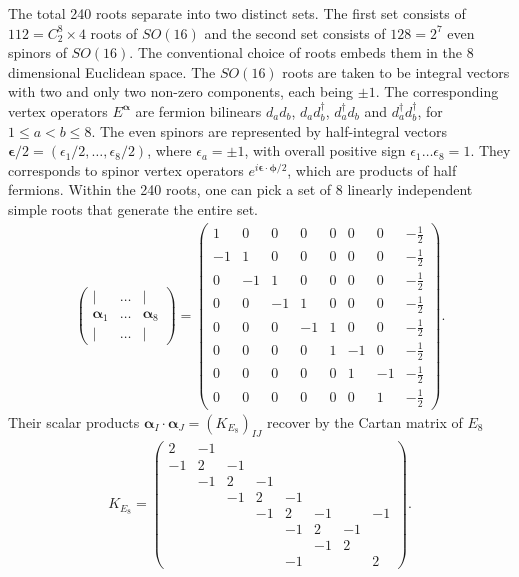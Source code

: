The total 240 roots separate into two distinct sets. The first set consists of $112=C^8_2\times4$ roots of $SO(16)$ and the second set consists of $128=2^7$ even spinors of $SO(16)$. The conventional choice of roots embeds them in the 8 dimensional Euclidean space. The $SO(16)$ roots are taken to be integral vectors with two and only two non-zero components, each being $\pm1$. The corresponding vertex operators $E^{\boldsymbol\alpha}$ are fermion bilinears $d_ad_b$, $d_ad_b^\dagger$, $d_a^\dagger d_b$ and $d_a^\dagger d_b^\dagger$, for $1\leq a<b\leq8$. The even spinors are represented by half-integral vectors $\boldsymbol\epsilon/2=(\epsilon_1/2,\ldots,\epsilon_8/2)$, where $\epsilon_a=\pm1$, with overall positive sign $\epsilon_1\ldots\epsilon_8=1$. They corresponds to spinor vertex operators $e^{i\boldsymbol\epsilon\cdot\boldsymbol\phi/2}$, which are products of half fermions. Within the 240 roots, one can pick a set of 8 linearly independent simple roots that generate the entire set. \begin{gather}\begin{pmatrix}|&\ldots&|\\\boldsymbol\alpha_1&\ldots&\boldsymbol\alpha_8\\|&\ldots&|\end{pmatrix}=\left(\begin{smallmatrix}
1 & 0 & 0 & 0 & 0 & 0 & 0 & -\frac{1}{2} \\
-1 & 1 & 0 & 0 & 0 & 0 & 0 & -\frac{1}{2} \\
0 & -1 & 1 & 0 & 0 & 0 & 0 & -\frac{1}{2} \\
0 & 0 & -1 & 1 & 0 & 0 & 0 & -\frac{1}{2} \\
0 & 0 & 0 & -1 & 1 & 0 & 0 & -\frac{1}{2} \\
0 & 0 & 0 & 0 & 1 & -1 & 0 & -\frac{1}{2} \\
0 & 0 & 0 & 0 & 0 & 1 & -1 & -\frac{1}{2} \\
0 & 0 & 0 & 0 & 0 & 0 & 1 & -\frac{1}{2} \end{smallmatrix}\right).\label{E8simpleroots0}\end{gather} Their scalar products $\boldsymbol\alpha_I\cdot\boldsymbol\alpha_J=(K_{E_8})_{IJ}$ recover by the Cartan matrix of $E_8$ \begin{align}K_{E_8}=\left(\begin{smallmatrix}2&-1&&&&&&\\-1&2&-1&&&&&\\&-1&2&-1&&&&\\&&-1&2&-1&&&\\&&&-1&2&-1&&-1\\&&&&-1&2&-1&\\&&&&&-1&2&\\&&&&-1&&&2\end{smallmatrix}\right).\label{KE8}\end{align}

